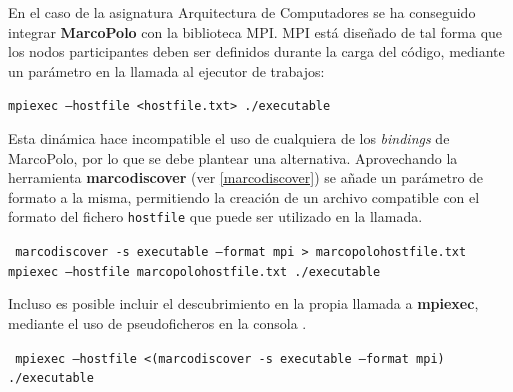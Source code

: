 En el caso de la asignatura Arquitectura de Computadores se ha conseguido integrar \textbf{MarcoPolo} con la biblioteca MPI. MPI está diseñado de tal forma que los nodos participantes deben ser definidos durante la carga del código, mediante un parámetro en la llamada al ejecutor de trabajos:

\texttt{mpiexec --hostfile <hostfile.txt> ./executable}

Esta dinámica hace incompatible el uso de cualquiera de los \textit{bindings} de MarcoPolo, por lo que se debe plantear una alternativa. Aprovechando la herramienta \textbf{marcodiscover} (ver \ref{marcodiscover}) se añade un parámetro de formato a la misma, permitiendo la creación de un archivo compatible con el formato del fichero \texttt{hostfile} que puede ser utilizado en la llamada.

\texttt{
marcodiscover -s executable --format mpi > marcopolohostfile.txt
mpiexec --hostfile marcopolohostfile.txt ./executable
}

Incluso es posible incluir el descubrimiento en la propia llamada a \textbf{mpiexec}, mediante el uso de pseudoficheros en la consola \cite{pseudofile}.

\texttt{
	mpiexec --hostfile <(marcodiscover -s executable --format mpi) ./executable
}

